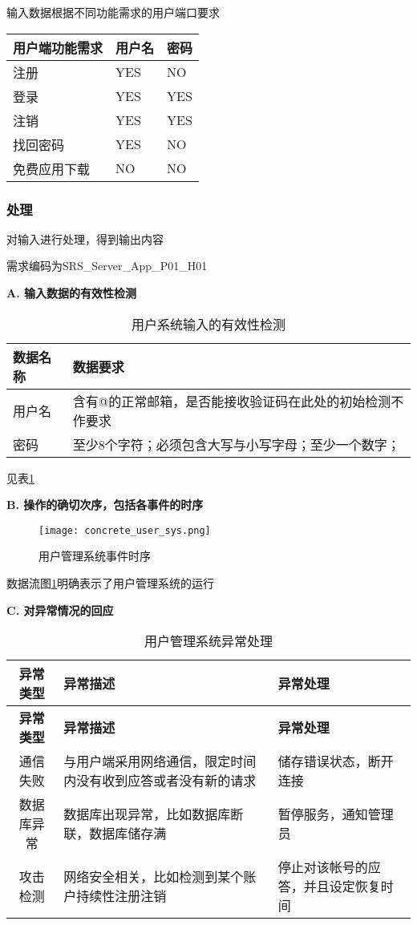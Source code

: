 输入数据根据不同功能需求的用户端口要求

\begin{longtable}[]{@{}lll@{}}
\toprule
用户端功能需求 & 用户名 & 密码\tabularnewline
\midrule
\endhead
注册 & YES & NO\tabularnewline
登录 & YES & YES\tabularnewline
注销 & YES & YES\tabularnewline
找回密码 & YES & NO\tabularnewline
免费应用下载 & NO & NO \tabularnewline
\bottomrule
\end{longtable}

\subsubsection{处理}

对输入进行处理，得到输出内容

需求编码为SRS\_Server\_App\_P01\_H01

\textbf{A. 输入数据的有效性检测}

\begin{longtable}[]{@{}ll@{}}
\caption{用户系统输入的有效性检测}\label{tab:concrete_user_sys_input_valid}\\
\toprule
数据名称 & 数据要求\tabularnewline
\midrule
\endhead
用户名 & 含有@的正常邮箱，是否能接收验证码在此处的初始检测不作要求\tabularnewline
密码 &
至少8个字符；必须包含大写与小写字母；至少一个数字；\tabularnewline
\bottomrule
\end{longtable}

见表\ref{tab:concrete_user_sys_input_valid}

\textbf{B. 操作的确切次序，包括各事件的时序}

\begin{figure}[ht]
	\centering
	\texttt{[image: concrete\_user\_sys.png]}
	\caption{用户管理系统事件时序} \label{fig:concrete_user_sys}
\end{figure}


数据流图\ref{fig:concrete_user_sys}明确表示了用户管理系统的运行


\textbf{C. 对异常情况的回应}

\begin{longtable}{|c|p{6cm}|p{6cm}|}
\caption{用户管理系统异常处理}\label{tab:developer_exception} \\
\hline
\textbf{异常类型} & \textbf{异常描述} & \textbf{异常处理}\\
\hline
\endfirsthead
\hline
\textbf{异常类型} & \textbf{异常描述} & \textbf{异常处理}\\
\hline
\endhead
\hline 
\endfoot
\hline
\endlastfoot
通信失败 & 
与用户端采用网络通信，限定时间内没有收到应答或者没有新的请求 &
储存错误状态，断开连接\\
数据库异常 & 数据库出现异常，比如数据库断联，数据库储存满 &
暂停服务，通知管理员\\
攻击检测 & 网络安全相关，比如检测到某个账户持续性注册注销 &
停止对该帐号的应答，并且设定恢复时间\\
\end{longtable}

